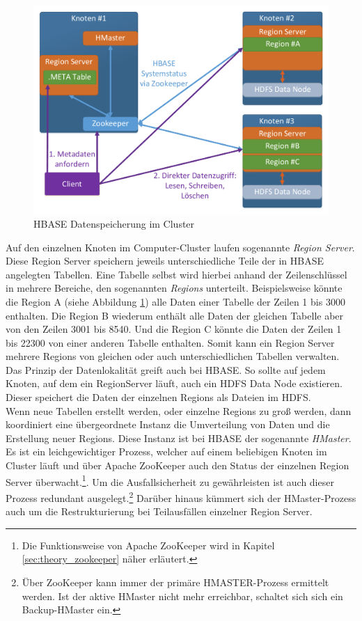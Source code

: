 \begin{figure}[ht]
  \centering
  \includegraphics[width=\textwidth]{./resource/hbase_cluster_architecture.pdf}
  \caption{HBASE Datenspeicherung im Cluster}
  \label{fig:hbase_cluster_architecture}
\end{figure}

\noindent
Auf den einzelnen Knoten im Computer-Cluster laufen sogenannte \textit{Region Server}. Diese Region Server speichern jeweils unterschiedliche Teile der in HBASE angelegten Tabellen. Eine Tabelle selbst wird hierbei anhand der Zeilenschlüssel in mehrere Bereiche, den sogenannten \textit{Regions} unterteilt. Beispielsweise könnte die Region A (siehe Abbildung \ref{fig:hbase_cluster_architecture}) alle Daten einer Tabelle der Zeilen 1 bis 3000 enthalten. Die Region B wiederum enthält alle Daten der gleichen Tabelle aber von den Zeilen 3001 bis 8540. Und die Region C könnte die Daten der Zeilen 1 bis 22300 von einer anderen Tabelle enthalten. Somit kann ein Region Server mehrere Regions von gleichen oder auch unterschiedlichen Tabellen verwalten.  Das Prinzip der Datenlokalität greift auch bei HBASE. So sollte auf  jedem Knoten, auf dem ein RegionServer läuft, auch ein HDFS Data Node existieren. Dieser speichert die Daten der einzelnen Regions als Dateien im HDFS.\\

\noindent
Wenn neue Tabellen erstellt werden, oder einzelne Regions zu groß werden, dann koordiniert eine übergeordnete Instanz die Umverteilung von Daten und die Erstellung neuer Regions. Diese Instanz ist bei HBASE der sogenannte \textit{HMaster}. Es ist ein leichgewichtiger Prozess, welcher auf einem beliebigen Knoten im Cluster läuft und über Apache ZooKeeper auch den Status der einzelnen Region Server überwacht.\footnote{Die Funktionsweise von Apache ZooKeeper wird in Kapitel \ref{sec:theory_zookeeper} näher erläutert.}. Um die Ausfallsicherheit zu gewährleisten ist auch dieser Prozess redundant ausgelegt.\footnote{Über ZooKeeper kann immer der primäre HMASTER-Prozess ermittelt werden. Ist der aktive HMaster nicht mehr erreichbar, schaltet sich sich ein Backup-HMaster ein.} Darüber hinaus kümmert sich der HMaster-Prozess auch um die Restrukturierung bei Teilausfällen einzelner Region Server. 

